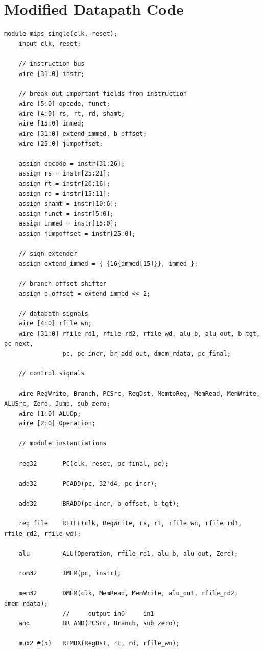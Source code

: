 \documentclass[12pt]{article}
\begin{document}
\section{Modified Datapath Code}
{\tiny
\begin{verbatim}
module mips_single(clk, reset);
    input clk, reset;

    // instruction bus
    wire [31:0] instr;

    // break out important fields from instruction
    wire [5:0] opcode, funct;
    wire [4:0] rs, rt, rd, shamt;
    wire [15:0] immed;
    wire [31:0] extend_immed, b_offset;
    wire [25:0] jumpoffset;

    assign opcode = instr[31:26];
    assign rs = instr[25:21];
    assign rt = instr[20:16];
    assign rd = instr[15:11];
    assign shamt = instr[10:6];
    assign funct = instr[5:0];
    assign immed = instr[15:0];
    assign jumpoffset = instr[25:0];

    // sign-extender
    assign extend_immed = { {16{immed[15]}}, immed };

    // branch offset shifter
    assign b_offset = extend_immed << 2;

    // datapath signals
    wire [4:0] rfile_wn;
    wire [31:0] rfile_rd1, rfile_rd2, rfile_wd, alu_b, alu_out, b_tgt, pc_next,
                pc, pc_incr, br_add_out, dmem_rdata, pc_final;

    // control signals

    wire RegWrite, Branch, PCSrc, RegDst, MemtoReg, MemRead, MemWrite, ALUSrc, Zero, Jump, sub_zero;
    wire [1:0] ALUOp;
    wire [2:0] Operation;

    // module instantiations

    reg32		PC(clk, reset, pc_final, pc);

    add32 		PCADD(pc, 32'd4, pc_incr);

    add32 		BRADD(pc_incr, b_offset, b_tgt);

    reg_file	RFILE(clk, RegWrite, rs, rt, rfile_wn, rfile_rd1, rfile_rd2, rfile_wd);

    alu 		ALU(Operation, rfile_rd1, alu_b, alu_out, Zero);

    rom32 		IMEM(pc, instr);

    mem32 		DMEM(clk, MemRead, MemWrite, alu_out, rfile_rd2, dmem_rdata);
                //     output in0     in1
    and  		BR_AND(PCSrc, Branch, sub_zero);

    mux2 #(5) 	RFMUX(RegDst, rt, rd, rfile_wn);


\end{verbatim}}
\end{document}
